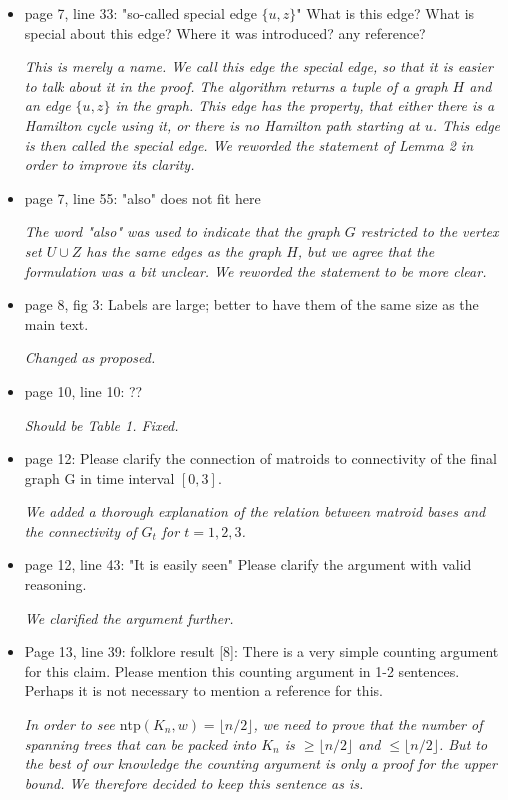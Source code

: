 \documentclass[11pt,a4paper]{article}
\begin{document}
\begin{itemize}
\item page 7, line 33: "so-called special edge $\{u, z\}$" What is this edge? What is special about this edge? Where it was introduced? any reference? 

\textit{This is merely a name. We call this edge the \emph{special edge}, so that it is easier to talk about it in the proof. The algorithm returns a tuple of a graph $H$ and an edge $\{u,z\}$ in the graph. This edge has the property, that either there is a Hamilton cycle using it, or there is no Hamilton path starting at $u$. This edge is then called the special edge. We reworded the statement of Lemma 2 in order to improve its clarity.}

\item page 7, line 55: "also" does not fit here

\textit{The word "also" was used to indicate that the graph $G$ restricted to the vertex set $U \cup Z$ has the same edges as the graph $H$, but we agree that the formulation was a bit unclear. We reworded the statement to be more clear.}

\item page 8, fig 3: Labels are large; better to have them of the same size as the main text.

\textit{Changed as proposed.}

\item page 10, line 10: ??

\textit{Should be Table 1. Fixed.}

\item page 12: Please clarify the connection of matroids to connectivity of the final graph G in time interval $[0,3]$.

\textit{We added a thorough explanation of the relation between matroid bases and the connectivity of $G_t$ for $t=1,2,3$.}

\item page 12, line 43: "It is easily seen" Please clarify the argument with valid reasoning.

\textit{We clarified the argument further.}

\item Page 13, line 39: folklore result [8]: There is a very simple counting argument for this claim. Please mention this counting argument in 1-2 sentences. Perhaps it is not necessary to mention a reference for this.

\textit{In order to see $\text{ntp}(K_n, w) = \lfloor n/2 \rfloor$, we need to prove that the number of spanning trees that can be packed into $K_n$ is $\geq \lfloor n/2 \rfloor$ and $\leq \lfloor n/2 \rfloor$. But to the best of our knowledge the counting argument is only a proof for the upper bound. We therefore decided to keep this sentence as is.}


\end{itemize}
\end{document}
